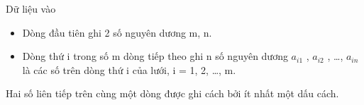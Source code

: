 Dữ liệu vào  
\begin{itemize}
	\item     Dòng đầu tiên ghi 2 số nguyên dương m, n.   
	\item     Dòng thứ i trong số m dòng tiếp theo ghi n số nguyên dương $a_{i1}$    , $a_{i2}$    , …, $a_{in}$    là các số trên dòng thứ i của lưới, i = 1, 2, …, m.   
\end{itemize}

   Hai số liên tiếp trên cùng một dòng được ghi cách bởi ít nhất một dấu cách.